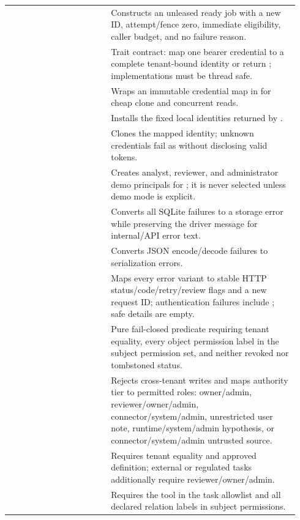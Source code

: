 \begin{longtable}{L{0.33\linewidth}L{0.61\linewidth}}
 & Constructs an unleased ready job with a new ID, attempt/fence zero, immediate eligibility, caller budget, and no failure reason. \\
 & Trait contract: map one bearer credential to a complete tenant-bound identity or return ; implementations must be thread safe. \\
 & Wraps an immutable credential map in  for cheap clone and concurrent reads. \\
 & Installs the fixed local identities returned by . \\
 & Clones the mapped identity; unknown credentials fail as  without disclosing valid tokens. \\
 & Creates analyst, reviewer, and administrator demo principals for ; it is never selected unless demo mode is explicit. \\
 & Converts all SQLite failures to a storage error while preserving the driver message for internal/API error text. \\
 & Converts JSON encode/decode failures to serialization errors. \\
 & Maps every error variant to stable HTTP status/code/retry/review flags and a new request ID; authentication failures include ; safe details are empty. \\
 & Pure fail-closed predicate requiring tenant equality, every object permission label in the subject permission set, and neither revoked nor tombstoned status. \\
 & Rejects cross-tenant writes and maps authority tier to permitted roles: owner/admin, reviewer/owner/admin, connector/system/admin, unrestricted user note, runtime/system/admin hypothesis, or connector/system/admin untrusted source. \\
 & Requires tenant equality and approved definition; external or regulated tasks additionally require reviewer/owner/admin. \\
 & Requires the tool in the task allowlist and all declared relation labels in subject permissions. \\

\end{longtable}
